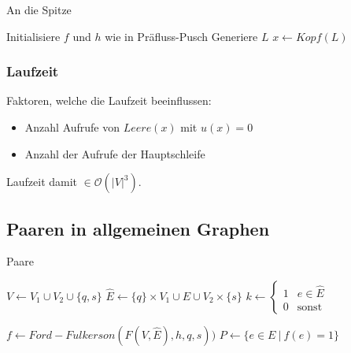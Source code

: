 \begin{algorithm}[H]
	\caption{An die Spitze}

	\BlankLine
	
	Initialisiere $f$ und $h$ wie in Präfluss-Pusch \newline
	Generiere $L$ \newline
	$x \longleftarrow Kopf(L)$
	\BlankLine

	\BlankLine

\end{algorithm}

\subsubsection{Laufzeit}
Faktoren, welche die Laufzeit beeinflussen:
\begin{itemize}
	\item Anzahl Aufrufe von \(Leere(x)\) mit \(u(x) = 0\)
	\item Anzahl der Aufrufe der Hauptschleife
\end{itemize}
Laufzeit damit \(\in \mathcal{O}(|V|^3)\).



\subsection{Paaren in allgemeinen Graphen}
\begin{algorithm}[H]
	\caption{Paare}

	\BlankLine
	
	$V \longleftarrow V_1 \cup V_2 \cup \{ q,s \}$ \newline
	$\hat{E} \longleftarrow \{ q \} \times V_1 \cup E \cup V_2 \times \{ s \} $ \newline
	$k \longleftarrow \begin{cases}1 & e \in \hat{E} \\ 0 & \text{sonst}\end{cases}$ \newline
	\BlankLine

	$f \longleftarrow Ford-Fulkerson( F(V, \hat{E} ),h,q,s)) $ \newline
	$P \longleftarrow \{ e \in E~|~f(e) = 1 \} $
\end{algorithm}

